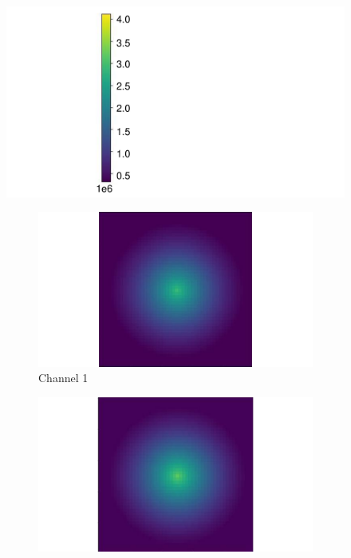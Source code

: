\begin{figure}[htbp]
    \centering
    \begin{minipage}{0.10\textwidth}
        \centering
        \includegraphics[width=\textwidth]{figures/raw_data/21/T3500/color_bar.pdf}
    \end{minipage}
    \begin{minipage}{0.87\textwidth}
        \centering
        \begin{subfigure}{0.23\textwidth}
            \includegraphics[width=\textwidth]{figures/raw_data/21/T3500/channel_1.pdf}
            \caption{Channel 1}
        \end{subfigure}
        \begin{subfigure}{0.23\textwidth}
            \includegraphics[width=\textwidth]{figures/raw_data/21/T3500/channel_2.pdf}

\end{subfigure}
\end{minipage}
\end{figure}
